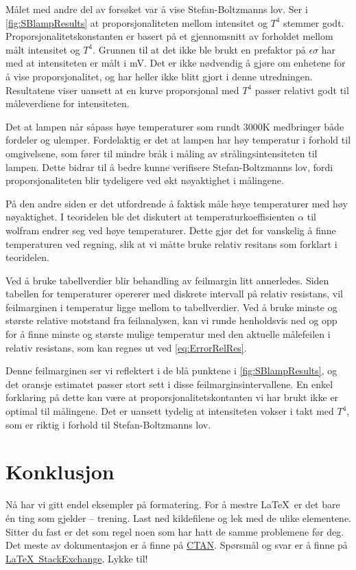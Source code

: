 Målet med andre del av forsøket var å vise Stefan-Boltzmanns lov. Ser i \autoref{fig:SBlampResults} at proporsjonaliteten mellom intensitet og $T^4$ stemmer godt. Proporsjonalitetskonstanten er basert på et gjennomsnitt av forholdet mellom målt intensitet og $T^4$. Grunnen til at det ikke ble brukt en prefaktor på $\epsilon \sigma$ har med at intensiteten er målt i mV. Det er ikke nødvendig å gjøre om enhetene for å vise proporsjonalitet, og har heller ikke blitt gjort i denne utredningen. Resultatene viser uansett at en kurve proporsjonal med $T^4$ passer relativt godt til måleverdiene for intensiteten.

Det at lampen når såpass høye temperaturer som rundt 3000K medbringer både fordeler og ulemper. Fordelaktig er det at lampen har høy temperatur i forhold til omgivelsene, som fører til mindre bråk i måling av strålingsintensiteten til lampen. Dette bidrar til å bedre kunne verifisere Stefan-Boltzmanns lov, fordi proporsjonaliteten blir tydeligere ved økt nøyaktighet i målingene.

På den andre siden er det utfordrende å faktisk måle høye temperaturer med høy nøyaktighet. I teoridelen ble det diskutert at temperaturkoeffisienten  $\alpha$ til wolfram endrer seg ved høye temperaturer. Dette gjør det for vanskelig å finne temperaturen ved regning, slik at vi måtte bruke relativ resitans som forklart i teoridelen.

Ved å bruke tabellverdier blir behandling av feilmargin litt annerledes. Siden tabellen for temperaturer opererer med diskrete intervall på relativ resistans, vil feilmarginen i temperatur ligge mellom to tabellverdier. Ved å bruke minste og største relative motstand fra feilanalysen, kan vi runde henholdsvis ned og opp for å finne minste og største mulige temperatur med den aktuelle målefeilen i relativ resistans, som kan regnes ut ved \eqref{eq:ErrorRelRes}. 

Denne feilmarginen ser vi reflektert i de blå punktene i \autoref{fig:SBlampResults}, og det oransje estimatet passer stort sett i disse feilmarginsintervallene. En enkel forklaring på dette kan være at proporsjonalitetskontanten vi har brukt ikke er optimal til målingene. Det er uansett tydelig at intensiteten vokser i takt med $T^4$, som er riktig i forhold til Stefan-Boltzmanns lov.

\section{Konklusjon}
Nå har vi gitt endel eksempler på formatering. For å mestre \LaTeX\ er det bare én ting som gjelder -- trening. Last ned kildefilene og lek med de ulike elementene. Sitter du fast er det som regel noen som har hatt de samme problemene før deg. Det meste av dokumentasjon er å finne på \href{http://www.ctan.org/}{CTAN}. Spørsmål og svar er å finne på \href{http://tex.stackexchange.com/}{\LaTeX\ StackExchange}. Lykke til!

